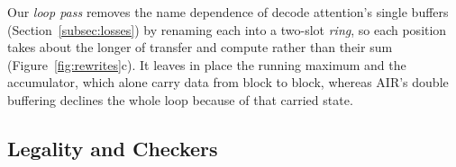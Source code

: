\label{subsec:rings}
Our \emph{loop pass} removes the name dependence of decode attention's single buffers (Section~\ref{subsec:losses}) by renaming each into a two-slot \emph{ring}, so each position takes about the longer of transfer and compute rather than their sum (Figure~\ref{fig:rewrites}c).
It leaves in place the running maximum and the accumulator, which alone carry data from block to block, whereas AIR's double buffering declines the whole loop because of that carried state.

\subsection{Legality and Checkers}
\label{subsec:legality}

